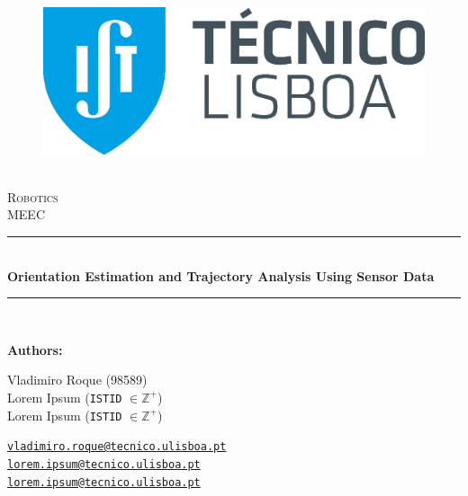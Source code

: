 \documentclass[12pt]{article}
\newcommand{\HRule}{\rule{\linewidth}{0.5mm}} %
\begin{document}
\begin{center}
    \begin{figure}
        \vspace{-1.0cm}
        \includegraphics[scale = 0.3, left]{Imagens/IST_A.eps} %
    \end{figure}
    \mbox{}\\[2.0cm]
    \textsc{\Huge Robotics}\\[2.5cm]
    \textsc{\LARGE MEEC}\\[2.0cm]
    \HRule\\[0.4cm]
    {\large \bf {\selectfont Orientation Estimation and Trajectory Analysis Using Sensor Data}}\\[0.2cm]
    \HRule\\[1.5cm]
\end{center}

\begin{flushleft}
    \textbf{\selectfont Authors:}
\end{flushleft}

\begin{center}
    \begin{minipage}{0.5\textwidth}
        \begin{flushleft}
            Vladimiro Roque (98589)\\
            Lorem Ipsum (\texttt{ISTID} $\in \mathbb{Z}^+$)\\
            Lorem Ipsum (\texttt{ISTID} $\in \mathbb{Z}^+$)
        \end{flushleft}
    \end{minipage}%
    \begin{minipage}{0.5\textwidth}
        \begin{flushright}
            \href{mailto:vladimiro.roque@tecnico.ulisboa.pt}{\texttt{vladimiro.roque@tecnico.ulisboa.pt}}\\
            \href{mailto:lorem.ipsum@tecnico.ulisboa.pt}{\texttt{lorem.ipsum@tecnico.ulisboa.pt}}\\
            \href{mailto:lorem.ipsum@tecnico.ulisboa.pt}{\texttt{lorem.ipsum@tecnico.ulisboa.pt}}
        \end{flushright}
    \end{minipage}
\end{center}
    
\end{document}

